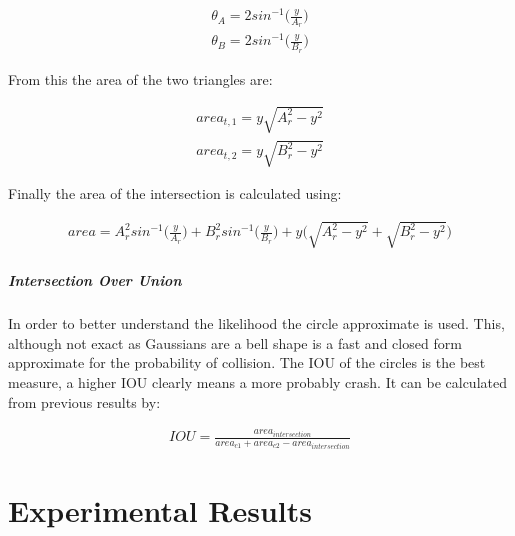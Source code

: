 \documentclass[11pt,twoside]{report}
\begin{document}
\begin{equation}
\begin{aligned}
\theta_{A} = 2sin^{-1} \bigg ( \frac{y}{A_{r}} \bigg )
\\
\theta_{B} = 2sin^{-1} \bigg ( \frac{y}{B_{r}} \bigg )
\end{aligned}
\label{circle_area_eq1}
\end{equation}

From this the area of the two triangles are:

\begin{equation}
\begin{aligned}
area_{t,1} = y \sqrt{A_{r}^{2} - y^{2}} \\
area_{t,2} = y \sqrt{B_{r}^{2} - y^{2}}
\end{aligned}
\label{circle_area_eq1}
\end{equation}


Finally the area of the intersection is calculated using:

\begin{equation}
\begin{aligned}
area = A_{r}^{2}sin^{-1} \big ( \frac{y}{A_{r}}) + B_{r}^{2}sin^{-1} \big ( \frac{y}{B_{r}}) + y \bigg ( \sqrt{A_{r}^{2} - y^{2}} + \sqrt{B_{r}^{2} - y^{2}} \bigg )
\end{aligned}
\label{circle_area_eq1}
\end{equation}

\paragraph{Intersection Over Union}
In order to better understand the likelihood the circle approximate is used. This, although not exact as Gaussians are a bell shape is a fast and closed form approximate for the probability of collision. The IOU of the circles is the best measure, a higher IOU clearly means a more probably crash. It can be calculated from previous results by:


\begin{equation}
\begin{aligned}
IOU = \frac{area_{intersection}}{ area_{c1} + area_{c2} - area_{intersection}}
\end{aligned}
\label{circle_area_eq1}
\end{equation}

\chapter{Experimental Results}
\end{document}
